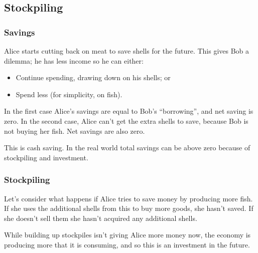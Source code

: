 
\subsection{Stockpiling}

\subsubsection{Savings}

Alice starts cutting back on meat to save shells for the future. This gives Bob a dilemma; he has less income so he can either:

\begin{itemize}
\item Continue spending, drawing down on his shells; or
\item Spend less (for simplicity, on fish).
\end{itemize}

In the first case Alice’s savings are equal to Bob’s “borrowing”, and net saving is zero. In the second case, Alice can’t get the extra shells to save, because Bob is not buying her fish. Net savings are also zero.

This is cash saving. In the real world total savings can be above zero because of stockpiling and investment.

\subsubsection{Stockpiling}

Let’s consider what happens if Alice tries to save money by producing more fish. If she uses the additional shells from this to buy more goods, she hasn’t saved. If she doesn’t sell them she hasn’t acquired any additional shells.

While building up stockpiles isn’t giving Alice more money now, the economy is producing more that it is consuming, and so this is an investment in the future.

